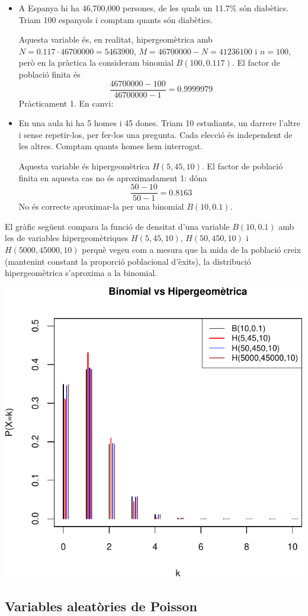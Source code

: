 \documentclass[
]{book}
\theoremstyle{definition}
\theoremstyle{definition}
\theoremstyle{definition}
\theoremstyle{remark}
\begin{document}
\begin{itemize}
\item
  A Espanya hi ha 46,700,000 persones, de les quals un 11.7\% són diabètics. Triam 100 espanyols i comptam quants són diabètics.

  Aquesta variable és, en realitat, hipergeomètrica amb \(N=0.117\cdot 46700000=5463900\), \(M=46700000-N=41236100\) i \(n=100\), però en la pràctica la consideram binomial \(B(100,0.117)\). El factor de població finita és
  \[
  \frac{46700000-100}{46700000-1}=0.9999979
  \]
  Pràcticament 1. En canvi:
\item
  En una aula hi ha 5 homes i 45 dones. Triam 10 estudiants, un darrere l'altre i sense repetir-los, per fer-los una pregunta. Cada elecció és independent de les altres. Comptam quants homes hem interrogat.

  Aquesta variable és hipergeomètrica \(H(5,45,10)\). El factor de població finita en aquesta cas no és aproximadament 1: dóna
  \[
  \frac{50-10}{50-1}=0.8163
  \]
  No és correcte aproximar-la per una binomial \(B(10,0.1)\).
\end{itemize}

El gràfic següent compara la funció de densitat d'una variable \(B(10,0.1)\) amb les de variables hipergeomètriques \(H(5,45,10)\), \(H(50,450,10)\) i \(H(5000,45000,10)\) perquè vegeu com a mesura que la mida de la població creix (mantenint constant la proporció poblacional d'èxits), la distribució hipergeomètrica s'aproxima a la binomial.

\begin{center}\includegraphics[width=0.5\linewidth]{Bioestadistica-II_files/figure-latex/unnamed-chunk-49-1} \end{center}

\hypertarget{variables-aleatuxf2ries-de-poisson}{%
\subsection{Variables aleatòries de Poisson}\label{variables-aleatuxf2ries-de-poisson}}
\end{document}
